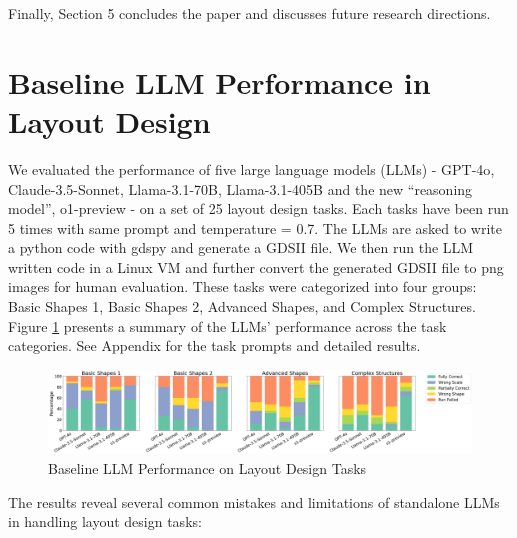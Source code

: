 \documentclass{article}
\begin{document}
Finally, Section 5 concludes the paper and discusses future research directions.

\section{Baseline LLM Performance in Layout Design}

We evaluated the performance of five large language models (LLMs) - GPT-4o\cite{gpt4o}, Claude-3.5-Sonnet\cite{claude35}, Llama-3.1-70B\cite{llama31}, Llama-3.1-405B\cite{llama31} and the new ``reasoning model'', o1-preview\cite{o1preview} - on a set of 25 layout design tasks. Each tasks have been run 5 times with same prompt and temperature = 0.7. The LLMs are asked to write a python code with gdspy\cite{gdspy} and generate a GDSII file. We then run the LLM written code in a Linux VM and further convert the generated GDSII file to png images for human evaluation. These tasks were categorized into four groups: Basic Shapes 1, Basic Shapes 2, Advanced Shapes, and Complex Structures. Figure \ref{fig:baseline-llm-performance} presents a summary of the LLMs' performance across the task categories. See Appendix for the task prompts and detailed results.

\begin{figure}[h]
  \centering
  \includegraphics[width=\textwidth]{baseline-llm-performance.png}
  \caption{Baseline LLM Performance on Layout Design Tasks}
  \label{fig:baseline-llm-performance}
\end{figure}

The results reveal several common mistakes and limitations of standalone LLMs in handling layout design tasks:
\end{document}
